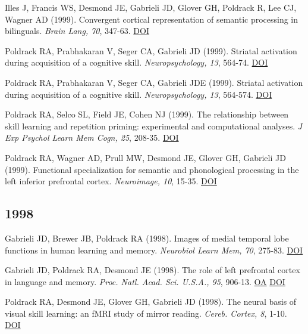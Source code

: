 Illes J, Francis WS, Desmond JE, Gabrieli JD, Glover GH, Poldrack R, Lee CJ, Wagner AD (1999). Convergent cortical representation of semantic processing in bilinguals. \textit{Brain Lang, 70}, 347-63. \href{http://dx.doi.org/10.1006/brln.1999.2186}{DOI} \vspace{2mm}

Poldrack RA, Prabhakaran V, Seger CA, Gabrieli JD (1999). Striatal activation during acquisition of a cognitive skill. \textit{Neuropsychology, 13}, 564-74. \href{http://dx.doi.org/10.1037//0894-4105.13.4.564}{DOI} \vspace{2mm}

Poldrack RA, Prabhakaran V, Seger CA, Gabrieli JDE (1999). Striatal activation during acquisition of a cognitive skill. \textit{Neuropsychology, 13}, 564-574. \href{http://dx.doi.org/10.1037/0894-4105.13.4.564}{DOI} \vspace{2mm}

Poldrack RA, Selco SL, Field JE, Cohen NJ (1999). The relationship between skill learning and repetition priming: experimental and computational analyses. \textit{J Exp Psychol Learn Mem Cogn, 25}, 208-35. \href{http://dx.doi.org/10.1037//0278-7393.25.1.208}{DOI} \vspace{2mm}

Poldrack RA, Wagner AD, Prull MW, Desmond JE, Glover GH, Gabrieli JD (1999). Functional specialization for semantic and phonological processing in the left inferior prefrontal cortex. \textit{Neuroimage, 10}, 15-35. \href{http://dx.doi.org/10.1006/nimg.1999.0441}{DOI} \vspace{2mm}

\subsection*{1998}

Gabrieli JD, Brewer JB, Poldrack RA (1998). Images of medial temporal lobe functions in human learning and memory. \textit{Neurobiol Learn Mem, 70}, 275-83. \href{http://dx.doi.org/10.1006/nlme.1998.3853}{DOI} \vspace{2mm}

Gabrieli JD, Poldrack RA, Desmond JE (1998). The role of left prefrontal cortex in language and memory. \textit{Proc. Natl. Acad. Sci. U.S.A., 95}, 906-13. \href{https://www.ncbi.nlm.nih.gov/pmc/articles/PMC33815}{OA} \href{http://dx.doi.org/10.1073/pnas.95.3.906}{DOI} \vspace{2mm}

Poldrack RA, Desmond JE, Glover GH, Gabrieli JD (1998). The neural basis of visual skill learning: an fMRI study of mirror reading. \textit{Cereb. Cortex, 8}, 1-10. \href{http://dx.doi.org/10.1093/cercor/8.1.1}{DOI} \vspace{2mm}


